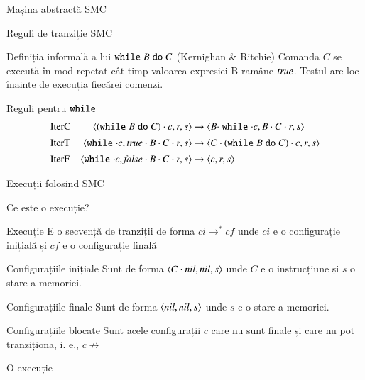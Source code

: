 \documentclass[handout,xcolor=pdftex,romanian,colorlinks]{beamer}
\begin{document}
\begin{section}{Mașina abstractă SMC}
\begin{frame}{Reguli de tranziție SMC}{}
\begin{block}{Definiția informală a lui $\mathrel{\text{\ttfamily while}} B \mathrel{\text{\ttfamily do}} C$ (Kernighan \& Ritchie)}
Comanda $C$ se execută în mod repetat cât timp valoarea expresiei B ramâne ${\it true}$.  Testul are loc înainte de execuția fiecărei comenzi.
\end{block}

\begin{block}{Reguli pentru $\mathrel{\text{\ttfamily while}}$}
\[\begin{array}{lr@{{}\rightarrow{}}l}
\mbox{IterC}&
\c{(\Swhile B \Sdo C) \cdot c, r, s} & \c{B \cdot \Swhile \cdot c, B \cdot C\cdot r, s}
\\[1ex]
\mbox{IterT}&
\c{\Swhile \cdot c, \Strue \cdot  B \cdot C \cdot r, s} & \c{C \cdot (\Swhile B \Sdo C) \cdot c,  r, s}
\\[1ex]
\mbox{IterF}&
\c{\Swhile \cdot c, \Sfalse \cdot  B \cdot C \cdot r, s} & \c{c,  r, s}
\end{array}\]
\end{block}
\end{frame}
\begin{subsection}{Execuții folosind SMC}

\begin{frame}{Ce este o execuție?}
\begin{block}{Execuție}
E o secvență de tranziții de forma $ci \rightarrow^\ast cf$ unde $ci$ e o configurație inițială și $cf$ e o configurație finală
\end{block}
\begin{block}{Configurațiile inițiale}
Sunt de forma  ${\langle{C\cdot {\textit{nil}}, {\textit{nil}}, s}\rangle}$ unde $C$ e o instrucțiune și $s$ o stare a memoriei.
\end{block}
\begin{block}{Configurațiile finale}
Sunt de forma  ${\langle{{\textit{nil}}, {\textit{nil}}, s}\rangle}$ unde $s$ e o stare a memoriei.
\end{block}
\begin{block}{Configurațiile blocate}
Sunt acele configurații $c$ care nu sunt finale și care nu pot tranziționa, i. e.,  $c \not\rightarrow$  
\end{block}
\end{frame}

\begin{frame}[fragile]{O execuție}


\end{frame}
\end{subsection}
\end{section}
\end{document}
